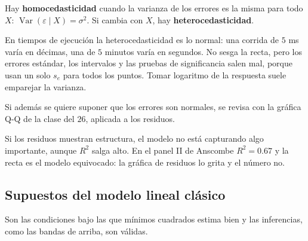 \documentclass[11pt,letterpaper]{article}
\begin{document}
\begin{definicion}
    Hay \textbf{homocedasticidad} cuando la varianza de los errores es
    la misma para todo $X$:
    $\operatorname{Var}(\varepsilon \mid X) = \sigma^2$. Si cambia con
    $X$, hay \textbf{heterocedasticidad}.
\end{definicion}

En tiempos de ejecución la heterocedasticidad es lo normal: una corrida
de $5$ ms varía en décimas, una de $5$ minutos varía en segundos. No
sesga la recta, pero los errores estándar, los intervalos y las pruebas
de significancia salen mal, porque usan un solo $s_e$ para todos los
puntos. Tomar logaritmo de la respuesta suele emparejar la varianza.

Si además se quiere suponer que los errores son normales, se revisa con
la gráfica Q-Q de la clase del $26$, aplicada a los residuos.

\begin{ojo}
    Si los residuos muestran estructura, el modelo no está capturando
    algo importante, aunque $R^2$ salga alto. En el panel II de
    Anscombe $R^2 = 0.67$ y la recta es el modelo equivocado: la
    gráfica de residuos lo grita y el número no.
\end{ojo}


\subsection*{Supuestos del modelo lineal clásico}

Son las condiciones bajo las que mínimos cuadrados estima bien y las
inferencias, como las bandas de arriba, son válidas.
\end{document}
